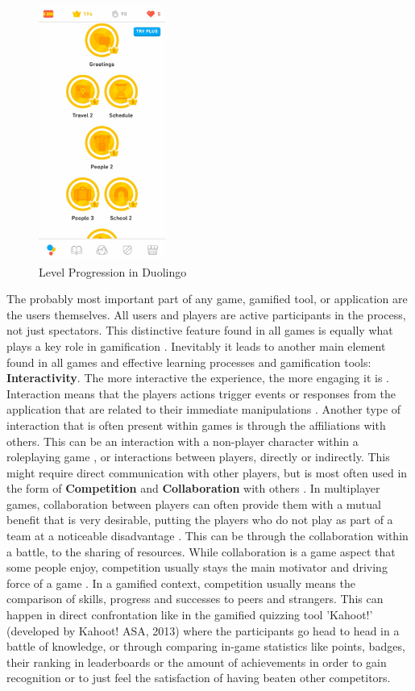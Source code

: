 \begin{figure}[h]
    \centering
    \includegraphics[width=0.37\textwidth]{figures/levels}
    \caption{Level Progression in Duolingo}
    \label{fig:4}
\end{figure}

The probably most important part of any game, gamified tool, or application are the users themselves. All users and players are active participants in the process, not just spectators. This distinctive feature found in all games is equally what plays a key role in gamification \cite{edu}. Inevitably it leads to another main element found in all games and effective learning processes and gamification tools: \textbf{Interactivity}. The more interactive the experience, the more engaging it is \cite{higher}. Interaction means that the players actions trigger events or responses from the application that are related to their immediate manipulations \cite{model}. Another type of interaction that is often present within games is through the affiliations with others. This can be an interaction with a non-player character within a roleplaying game \cite{engage}, or interactions between players, directly or indirectly. This might require direct communication with other players, but is most often used in the form of \textbf{Competition} and \textbf{Collaboration} with others \cite{model} \cite{higher}.
In multiplayer games, collaboration between players can often provide them with a mutual benefit that is very desirable, putting the players who do not play as part of a team at a noticeable disadvantage \cite{lifelong}. This can be through the collaboration within a battle, to the sharing of resources.
While collaboration is a game aspect that some people enjoy, competition usually stays the main motivator and driving force of a game \cite{lifelong}. In a gamified context, competition usually means the comparison of skills, progress and successes to peers and strangers. This can happen in direct confrontation like in the gamified quizzing tool 'Kahoot!' (developed by Kahoot! ASA, 2013) where the participants go head to head in a battle of knowledge, or through comparing in-game statistics like points, badges, their ranking in leaderboards or the amount of achievements in order to gain recognition \cite{higher} or to just feel the satisfaction of having beaten other competitors.

